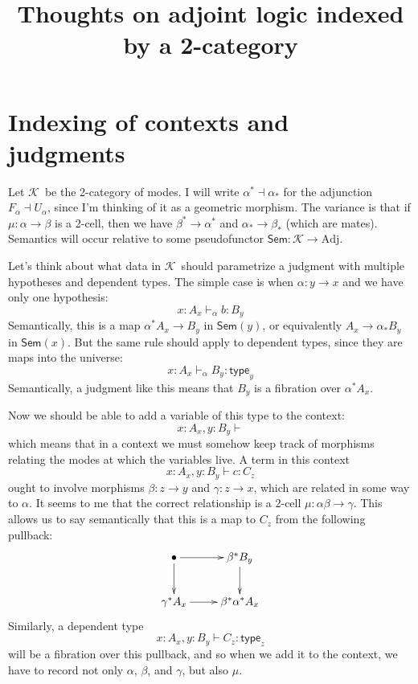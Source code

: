 \documentclass{amsart}
\title{Thoughts on adjoint logic indexed by a 2-category}
\def\type{\mathsf{type}}
\def\K{\ensuremath{\mathcal{K}}}
\def\sem{\mathsf{Sem}}
\theoremstyle{definition}
\begin{document}
\maketitle

\section{Indexing of contexts and judgments}
\label{sec:indexing-contexts}

Let \K\ be the 2-category of modes.
I will write $\alpha^* \dashv \alpha_*$ for the adjunction $F_\alpha \dashv U_\alpha$, since I'm thinking of it as a geometric morphism.
The variance is that if $\mu:\alpha\to\beta$ is a 2-cell, then we have $\beta^* \to \alpha^*$ and $\alpha_* \to \beta_*$ (which are mates).
Semantics will occur relative to some pseudofunctor $\sem:\K\to\mathrm{Adj}$.

Let's think about what data in \K\ should parametrize a judgment with multiple hypotheses and dependent types.
The simple case is when $\alpha:y\to x$ and we have only one hypothesis:
\[ x:A_x \vdash_{\alpha} b : B_y \]
Semantically, this is a map $\alpha^*A_x \to B_y$ in $\sem(y)$, or equivalently $A_x \to \alpha_* B_y$ in $\sem(x)$.
But the same rule should apply to dependent types, since they are maps into the universe:
\[ x:A_x \vdash_{\alpha} B_y : \type_y \]
Semantically, a judgment like this means that $B_y$ is a fibration over $\alpha^* A_x$.

Now we should be able to add a variable of this type to the context:
\[ x:A_x , y:B_y \vdash \]
which means that in a context we must somehow keep track of morphisms relating the modes at which the variables live.
A term in this context
\[ x:A_x , y:B_y \vdash c : C_z\]
ought to involve morphisms $\beta : z \to y$ and $\gamma: z\to x$, which are related in some way to $\alpha$.
It seems to me that the correct relationship is a 2-cell $\mu : \alpha \beta \to \gamma$.
This allows us to say semantically that this is a map to $C_z$ from the following pullback:
\begin{equation*}
  \vcenter{\xymatrix{
      \bullet \ar[r]\ar[d] &
      \beta^* B_y\ar[d]\\
      \gamma^* A_x \ar[r] &
      \beta^* \alpha^* A_x
      }}
\end{equation*}
Similarly, a dependent type
\[ x:A_x , y:B_y \vdash C_z :\type_z\]
will be a fibration over this pullback, and so when we add it to the context, we have to record not only $\alpha$, $\beta$, and $\gamma$, but also $\mu$.
\end{document}
